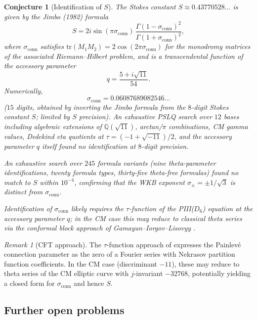 \documentclass[11pt,a4paper]{article}
\newtheorem{conjecture}[theorem]{Conjecture}
\theoremstyle{definition}
\theoremstyle{remark}
\newtheorem{remark}[theorem]{Remark}
\begin{document}
\begin{conjecture}[Identification of $S$]
\label{conj:S_id}
The Stokes constant $S\approx
0.43770528\ldots$ is given by the
Jimbo (1982) \cite{Jimbo1982} formula
\[
  S = 2i\sin(\pi\sigma_{\mathrm{conn}})
  \,\frac{\Gamma(1-\sigma_{\mathrm{conn}})^2}
  {\Gamma(1+\sigma_{\mathrm{conn}})^2},
\]
where $\sigma_{\mathrm{conn}}$ satisfies
$\mathrm{tr}(M_1 M_2) =
2\cos(2\pi\sigma_{\mathrm{conn}})$
for the monodromy matrices of the
associated Riemann--Hilbert problem,
and is a transcendental function of the
accessory parameter
\[
  q = \frac{5+i\sqrt{11}}{54}.
\]
Numerically,
\[
  \sigma_{\mathrm{conn}} =
  0.06087689082546\ldots
\]
($15$ digits, obtained by inverting the
Jimbo formula from the $8$-digit Stokes
constant $S$; limited by $S$ precision).
An exhaustive PSLQ search over $12$
bases including algebraic extensions of
$\mathbb{Q}(\sqrt{11})$, arctan/$\pi$
combinations, CM gamma values, Dedekind
eta quotients at $\tau = (-1+\sqrt{-11})/2$,
and the accessory parameter $q$ itself
found no identification at $8$-digit
precision.

An exhaustive search over $245$ formula
variants (nine theta-parameter
identifications, twenty formula types,
thirty-five theta-free formulas) found
no match to $S$ within $10^{-4}$,
confirming that the WKB exponent
$\sigma_\pm = \pm 1/\sqrt{3}$ is
distinct from $\sigma_{\mathrm{conn}}$.

Identification of $\sigma_{\mathrm{conn}}$
likely requires the $\tau$-function of
the PIII($D_6$) equation at the
accessory parameter $q$; in the CM case
this may reduce to classical theta
series via the conformal block approach
of Gamayun--Iorgov--Lisovyy
\cite{GIL2012}.
\end{conjecture}

\begin{remark}[CFT approach]
The $\tau$-function approach of
\cite{GIL2012} expresses the Painlev\'e
connection parameter as the zero of a
Fourier series with Nekrasov partition
function coefficients. In the CM case
(discriminant $-11$), these may reduce
to theta series of the CM elliptic curve
with $j$-invariant $-32768$,
potentially yielding a closed form for
$\sigma_{\mathrm{conn}}$ and hence $S$.
\end{remark}

\subsection{Further open problems}
\end{document}
